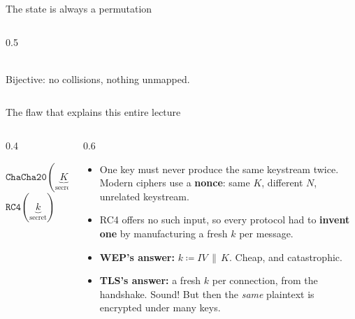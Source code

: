 \ifdefined\PRESENTATION\else\PassOptionsToClass{handout}{beamer}\fi\documentclass[aspectratio=169, lualatex]{beamer}
\begin{document}
\begin{frame}{The state is always a permutation}
\begin{columns}[c]
\begin{column}{0.5\textwidth}
\begin{center}
				\\[0.6em]
				\small Bijective: no collisions, nothing unmapped.
			\end{center}
		\end{column}
	\end{columns}
\end{frame}

\begin{frame}{The flaw that explains this entire lecture}
	\begin{columns}[c]
		\begin{column}{0.4\textwidth}
			\begin{center}
				\large
				$\texttt{ChaCha20}(\underbrace{K}_{\text{secret}}, \underbrace{N}_{\text{per message}}, \text{ctr})$
				\\[1.2em]
				$\texttt{RC4}(\underbrace{k}_{\text{secret}})$
			\end{center}
			\vspace{0.5em}
		\end{column}
		\begin{column}{0.6\textwidth}
			\begin{itemize}[<+(2)->]
				\item One key must never produce the same keystream twice. Modern ciphers use a \textbf{nonce}: same $K$, different $N$, unrelated keystream.
				\item RC4 offers no such input, so every protocol had to \textbf{invent one} by manufacturing a fresh $k$ per message.
				\item \textbf{WEP's answer:} $k \coloneq IV \,\|\, K$. Cheap, and catastrophic.
				\item \textbf{TLS's answer:} a fresh $k$ per connection, from the handshake. Sound! But then the \emph{same} plaintext is encrypted under many keys.
			\end{itemize}
		\end{column}
	\end{columns}
\end{frame}
\end{document}
